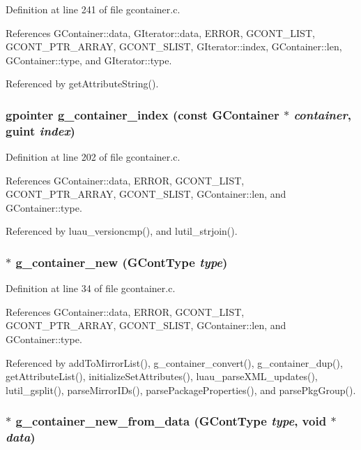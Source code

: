 Definition at line 241 of file gcontainer.c.

References GContainer::data, GIterator::data, ERROR, GCONT\_\-LIST, GCONT\_\-PTR\_\-ARRAY, GCONT\_\-SLIST, GIterator::index, GContainer::len, GContainer::type, and GIterator::type.

Referenced by get\-Attribute\-String().
\subsubsection{\setlength{\rightskip}{0pt plus 5cm}gpointer g\_\-container\_\-index (const {\bf GContainer} $\ast$ {\em container}, guint {\em index})}\label{gcontainer_8h_a12}




Definition at line 202 of file gcontainer.c.

References GContainer::data, ERROR, GCONT\_\-LIST, GCONT\_\-PTR\_\-ARRAY, GCONT\_\-SLIST, GContainer::len, and GContainer::type.

Referenced by luau\_\-versioncmp(), and lutil\_\-strjoin().
\subsubsection{$\ast$ g\_\-container\_\-new ({\bf GCont\-Type} {\em type})}\label{gcontainer_8h_a3}




Definition at line 34 of file gcontainer.c.

References GContainer::data, ERROR, GCONT\_\-LIST, GCONT\_\-PTR\_\-ARRAY, GCONT\_\-SLIST, GContainer::len, and GContainer::type.

Referenced by add\-To\-Mirror\-List(), g\_\-container\_\-convert(), g\_\-container\_\-dup(), get\-Attribute\-List(), initialize\-Set\-Attributes(), luau\_\-parse\-XML\_\-updates(), lutil\_\-gsplit(), parse\-Mirror\-IDs(), parse\-Package\-Properties(), and parse\-Pkg\-Group().
\subsubsection{$\ast$ g\_\-container\_\-new\_\-from\_\-data ({\bf GCont\-Type} {\em type}, void $\ast$ {\em data})}\label{gcontainer_8h_a4}




